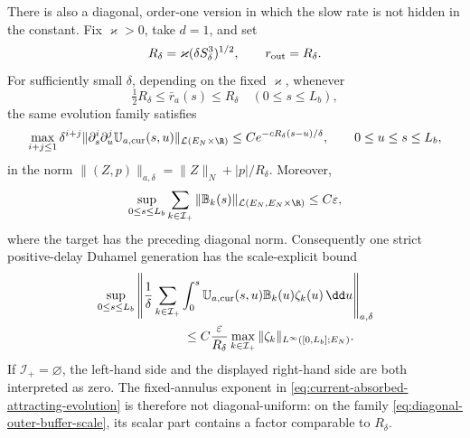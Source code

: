\begin{lemma}
There is also a diagonal, order-one version in which the slow rate is not
hidden in the constant.  Fix \(\varkappa>0\), take \(d=1\), and set
\begin{equation}
 R_\delta=\varkappa(\delta S_\delta^3)^{1/2},
 \qquad r_{\rm out}=R_\delta.                    \label{eq:diagonal-outer-buffer-scale}
\end{equation}
For sufficiently small \(\delta\), depending on the fixed
\(\varkappa\), whenever
\[
 \tfrac12R_\delta\le\bar r_a(s)\le R_\delta
 \quad(0\le s\le L_b),
\]
the same evolution family satisfies
\begin{equation}
 \max_{i+j\le1}\delta^{i+j}
 \|\partial_s^i\partial_u^j
       \mathbb U_{a,\rm cur}(s,u)\|_{\mathcal L(E_N\times\R)}
 \le C e^{-cR_\delta(s-u)/\delta},
 \qquad 0\le u\le s\le L_b,                       \label{eq:diagonal-current-absorbed-evolution}
\end{equation}
in the norm
\(\|(Z,p)\|_{a,\delta}=\|Z\|_N+|p|/R_\delta\).
Moreover,
\begin{equation}
 \sup_{0\le s\le L_b}
   \sum_{k\in\mathcal I_+}
   \|\mathbb B_k(s)\|_{\mathcal L(E_N,E_N\times\R)}
 \le C\varepsilon,                               \label{eq:diagonal-delayed-block-size}
\end{equation}
where the target has the preceding diagonal norm.  Consequently one strict
positive-delay Duhamel generation has the scale-explicit bound
\begin{align}
 &\sup_{0\le s\le L_b}
 \left\|
  \frac1\delta\sum_{k\in\mathcal I_+}
   \int_0^s\mathbb U_{a,\rm cur}(s,u)
      \mathbb B_k(u)\zeta_k(u)\,\dd u
 \right\|_{a,\delta}\notag\\
 &\hspace{7em}\le
 C\frac{\varepsilon}{R_\delta}
 \max_{k\in\mathcal I_+}
       \|\zeta_k\|_{L^\infty([0,L_b];E_N)}.       \label{eq:diagonal-one-generation}
\end{align}
If \(\mathcal I_+=\varnothing\), the left-hand side and the displayed
right-hand side are both interpreted as zero.
The fixed-annulus exponent in
\cref{eq:current-absorbed-attracting-evolution} is therefore not
diagonal-uniform: on the family
\cref{eq:diagonal-outer-buffer-scale}, its scalar part contains a factor
comparable to \(R_\delta\).
\end{lemma}

